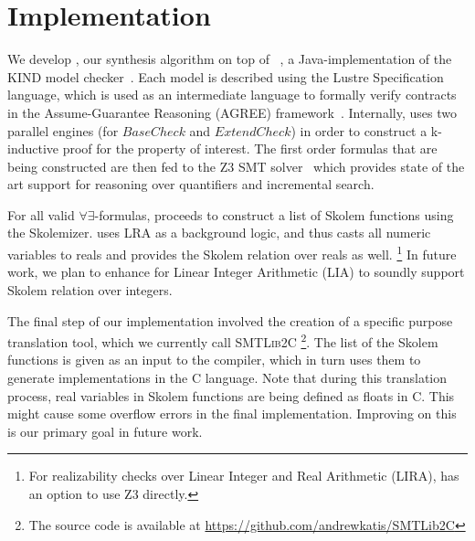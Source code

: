 \section{Implementation}
\label{sec:impl}

We develop \jkindsynt, our synthesis algorithm on top of \jkind~\cite{jkind},
a Java-implementation of the \textsc{KIND} model
checker~\cite{Hagen08:kind}. Each model is described using the Lustre
Specification language, which is used as an intermediate language to formally verify contracts in the
Assume-Guarantee Reasoning (\textsc{AGREE}) framework~\cite{NFM2012:CoGaMiWhLaLu}.
Internally, \jkind uses two parallel engines (for $\mathit{BaseCheck}$ and
$\mathit{ExtendCheck}$) in order to construct a k-inductive proof for the
property of interest.
The first order formulas that are being constructed are then fed to the \textsc{Z3} SMT
solver~\cite{DeMoura08:z3} which provides state of the art support for reasoning
over quantifiers and incremental search.

For all valid $\forall\exists$-formulas, \jkindsynt proceeds to construct a list of
Skolem functions using the \aeval Skolemizer.
\aeval uses LRA as a background logic, and thus casts all numeric variables to reals and provides the Skolem relation over reals as well.%
\footnote{For realizability checks over Linear Integer and Real
  Arithmetic (LIRA), \jkind has an option to use \textsc{Z3} directly.}
In future work, we plan to enhance \aeval for Linear Integer Arithmetic (LIA) to soundly support Skolem relation over integers.

The final step of our implementation involved the creation of a specific purpose
translation tool, which we currently call \textsc{SMTLib2C}%
\footnote{The source code
is available at \url{https://github.com/andrewkatis/SMTLib2C}}. The list
of the Skolem functions is given as an input to the compiler, which in turn uses
them to generate implementations in the C language. 
Note that during this translation process, real
variables in Skolem functions are being defined as floats in C. This might cause some
overflow errors in the final implementation. 
Improving on this is our primary goal in future work.



